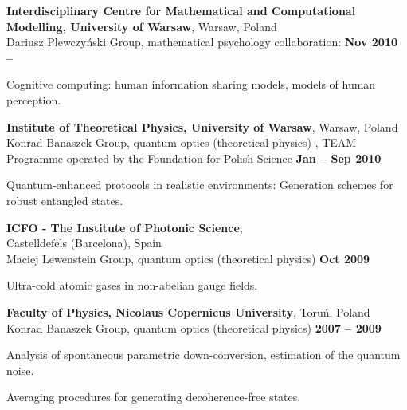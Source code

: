 \documentclass[margin,line]{resume}
\begin{document}
\begin{resume}
	{\bf  Interdisciplinary Centre for Mathematical and Computational Modelling, University of Warsaw}, Warsaw, Poland\\
	Dariusz Plewczyński Group, mathematical psychology \hfill collaboration: {\bf Nov 2010 -- }\\
    \begin{list2}
        \vspace*{-4mm}
        \item Cognitive computing: human information sharing models, models of human perception.
    \end{list2}

	{\bf Institute of Theoretical Physics, University of Warsaw}, Warsaw, Poland\\
	Konrad Banaszek Group, quantum optics (theoretical physics) ,
	TEAM Programme operated by the Foundation for Polish Science \hfill {\bf Jan -- Sep 2010}\\
    \begin{list2}
        \vspace*{-4mm}
        \item Quantum-enhanced protocols in realistic environments: Generation schemes for robust entangled states.
    \end{list2}

    {\bf ICFO - The Institute of Photonic Science},\\ Castelldefels (Barcelona), Spain\\
    Maciej Lewenstein Group, quantum optics (theoretical physics) \hfill {\bf Oct 2009}\\
    \begin{list2}
        \vspace*{-4mm}
        \item Ultra-cold atomic gases in non-abelian gauge fields.
    \end{list2}

    {\bf Faculty of Physics, Nicolaus Copernicus University}, Toruń, Poland\\
    Konrad Banaszek Group, quantum optics (theoretical physics) \hfill {\bf 2007 -- 2009}\\
    \begin{list2}
        \vspace*{-4mm}
        \item Analysis of spontaneous parametric down-conversion, estimation of the quantum noise.
        \item Averaging procedures for generating decoherence-free states.
    \end{list2}


\end{resume}
\end{document}
